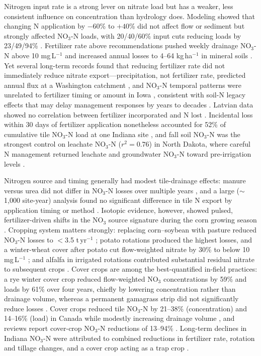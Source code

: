 Nitrogen input rate is a strong lever on nitrate load but has a weaker, less consistent influence on concentration than hydrology does. Modeling showed that changing N application by $-60$\% to $+40$\% did not affect flow or sediment but strongly affected NO$_3$-N loads, with 20/40/60\% input cuts reducing loads by 23/49/94\% \parencite{Chaplot2004}. Fertilizer rate above recommendations pushed weekly drainage NO$_3$-N above 10 mg\,L$^{-1}$ and increased annual losses to 4--64 kg\,ha$^{-1}$ in mineral soils \parencite{MILLER1979}. Yet several long-term records found that reducing fertilizer rate did not immediately reduce nitrate export---precipitation, not fertilizer rate, predicted annual flux at a Washington catchment \parencite{Kelley2017}, and NO$_3$-N temporal patterns were unrelated to fertilizer timing or amount in Iowa \parencite{Cambardella1999}, consistent with soil-N legacy effects that may delay management responses by years to decades \parencite{Bauwe2020}. Latvian data showed no correlation between fertilizer incorporated and N lost \parencite{Siksnane2017}. Incidental loss within 30 days of fertilizer application nonetheless accounted for 52\% of cumulative tile NO$_3$-N load at one Indiana site \parencite{Williams2022}, and fall soil NO$_3$-N was the strongest control on leachate NO$_3$-N ($r^2=0.76$) in North Dakota, where careful N management returned leachate and groundwater NO$_3$-N toward pre-irrigation levels \parencite{Derby2009}.

Nitrogen source and timing generally had modest tile-drainage effects: manure versus urea did not differ in NO$_3$-N losses over multiple years \parencite{Randall2000}, and a large ($\sim$1,000 site-year) analysis found no significant difference in tile N export by application timing or method \parencite{Ward2018}. Isotopic evidence, however, showed pulsed, fertilizer-driven shifts in the NO$_3$ source signature during the corn growing season \parencite{Hu2024}. Cropping system matters strongly: replacing corn--soybean with pasture reduced NO$_3$-N losses to $<$3.5 t\,yr$^{-1}$ \parencite{Chaplot2004}; potato rotations produced the highest losses, and a winter-wheat cover after potato cut flow-weighted nitrate by 30\% to below 10 mg\,L$^{-1}$ \parencite{RITTER1995}; and alfalfa in irrigated rotations contributed substantial residual nitrate to subsequent crops \parencite{ROBBINS1980}. Cover crops are among the best-quantified in-field practices: a rye winter cover crop reduced flow-weighted NO$_3$ concentrations by 59\% and loads by 61\% over four years, chiefly by lowering concentration rather than drainage volume, whereas a permanent gamagrass strip did not significantly reduce losses \parencite{Kaspar2007}. Cover crops reduced tile NO$_3$-N by 21--38\% (concentration) and 14--16\% (load) in Canada while modestly increasing drainage volume \parencite{Drury2014}, and reviews report cover-crop NO$_3$-N reductions of 13--94\% \parencite{Ward2018}. Long-term declines in Indiana NO$_3$-N were attributed to combined reductions in fertilizer rate, rotation and tillage changes, and a cover crop acting as a trap crop \parencite{Kladivko2004,Kladivko2021}.

